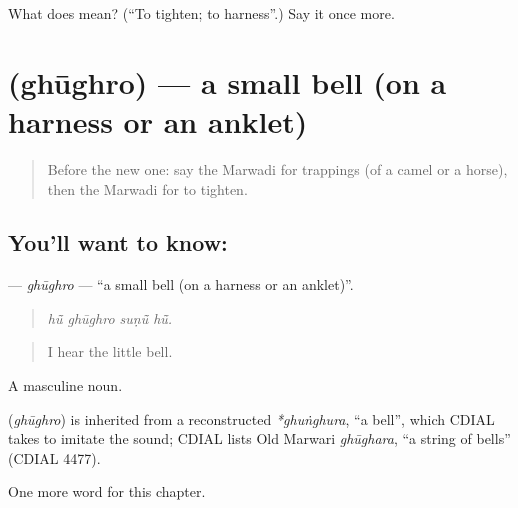 \begin{tcolorbox}[breakable,colback=teal!4,colframe=teal!35!black,title={Before you move on}]
What does  mean? (\textquotedblleft{}To tighten; to harness\textquotedblright{}.) Say it once more.
\end{tcolorbox}
\section[\texorpdfstring{\mw{घूघरो} (ghūghro)}{घूघरो (ghūghro)}]{ (ghūghro) — a small bell (on a harness or an anklet)}

\label{lesson:MW-C233-ghughro}



\begin{quote}
Before the new one: say the Marwadi for trappings (of a camel or a horse), then the Marwadi for to tighten.
\end{quote}

\subsection*{You'll want to know: }
\textbf{} — \emph{ghūghro} — \textquotedblleft{}a small bell (on a harness or an anklet)\textquotedblright{}.

\begin{quote}
   
\end{quote}

\begin{quote}
\emph{hū̃ ghūghro suṇū̃ hū̃.}
\end{quote}

\begin{quote}
I hear the little bell.
\end{quote}

A masculine noun.

\begin{cousinweb}
\textbf{} (\emph{ghūghro}) is inherited from a reconstructed \emph{*ghuṅghura}, \textquotedblleft{}a bell\textquotedblright{}, which CDIAL takes to imitate the sound; CDIAL lists Old Marwari \emph{ghūghara}, \textquotedblleft{}a string of bells\textquotedblright{} (CDIAL 4477).
\end{cousinweb}

\begin{grammarlens}[title={What you've built}]
One more word for this chapter.
\end{grammarlens}

